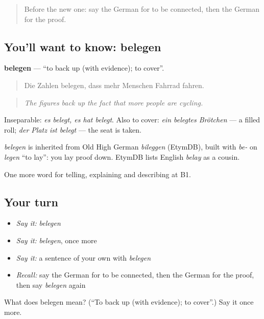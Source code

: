 \begin{quote}
Before the new one: say the German for to be connected, then the German for the proof.
\end{quote}

\subsection*{You'll want to know: belegen}
\textbf{belegen} — \textquotedblleft{}to back up (with evidence); to cover\textquotedblright{}.

\begin{quote}
Die Zahlen belegen, dass mehr Menschen Fahrrad fahren.
\end{quote}

\begin{quote}
\emph{The figures back up the fact that more people are cycling.}
\end{quote}

Inseparable: \emph{es belegt, es hat belegt}. Also to cover: \emph{ein belegtes Brötchen} — a filled roll; \emph{der Platz ist belegt} — the seat is taken.

\begin{cousinweb}
\emph{belegen} is inherited from Old High German \emph{bileggen} (EtymDB), built with \emph{be-} on \emph{legen} \textquotedblleft{}to lay\textquotedblright{}: you lay proof down. EtymDB lists English \emph{belay} as a cousin.
\end{cousinweb}

\begin{grammarlens}[title={What you've built}]
One more word for telling, explaining and describing at B1.
\end{grammarlens}

\subsection*{Your turn}
\begin{itemize}
\raggedright
  \item \emph{Say it:} \emph{belegen}
  \item \emph{Say it:} \emph{belegen}, once more
  \item \emph{Say it:} a sentence of your own with \emph{belegen}
  \item \emph{Recall:} say the German for to be connected, then the German for the proof, then say \emph{belegen} again
\end{itemize}

\begin{tcolorbox}[breakable,colback=teal!4,colframe=teal!35!black,title={Before you move on}]
What does belegen mean? (\textquotedblleft{}To back up (with evidence); to cover\textquotedblright{}.) Say it once more.
\end{tcolorbox}
